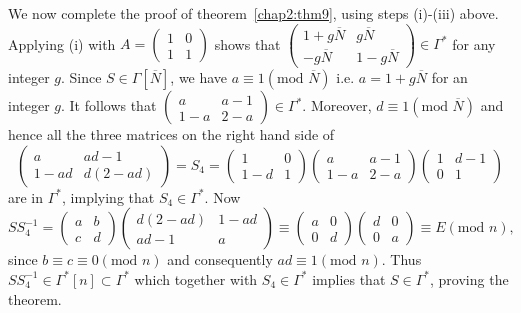 We now \pageoriginale complete the proof of theorem~\ref{chap2:thm9}, using steps
(i)-(iii) above. Applying (i) with $A =
\left(\begin{smallmatrix} 1&0\\1&1 \end{smallmatrix}\right)$ shows
that $\left(\begin{smallmatrix} 1+g\overline{N} &
  g\overline{N}\\ -g\overline{N} & 1-g\overline{N}
\end{smallmatrix} \right)\in
  \Gamma^{\ast}$ for any integer $g$. Since $S \in
  \Gamma[\overline{N}]$, we have $a\equiv 1(\text{mod } \overline{N})$
  i.e. $a=1+g\overline{N}$ for an integer $g$. It follows that
  $\left(\begin{smallmatrix} a& a-1\\
1-a& 2-a \end{smallmatrix}\right) \in
  \Gamma^{\ast}$. Moreover, $d\equiv 1(\text{mod } \overline{N})$ and hence
  all the three matrices on the right hand side of
$$
\left(\begin{smallmatrix} a & ad-1\\
1-ad & d (2-ad)\end{smallmatrix}\right) = S_4 =
\left(\begin{smallmatrix} 1 & 0\\1-d & 1 \end{smallmatrix}\right)
\left(\begin{smallmatrix} a&a-1\\1-a& 2-a \end{smallmatrix}\right)    
\left(\begin{smallmatrix} 1 & d-1\\ 0&1 \end{smallmatrix}\right)
$$
are in $\Gamma^{\ast}$, implying that $S_4 \in
\Gamma^{\ast}$. Now
$$
SS^{-1}_4 = \left(\begin{smallmatrix}
  a&b\\c&d \end{smallmatrix}\right) 
\left(\begin{smallmatrix} d(2-ad) & 1-ad\\
ad-1 & a \end{smallmatrix}\right)\equiv
\left(\begin{smallmatrix} a&0\\0&d \end{smallmatrix}\right)
\left(\begin{smallmatrix}d&0\\0&a \end{smallmatrix}\right)\equiv E
(\text{mod } n),
$$
since $b\equiv c \equiv 0(\text{mod } n)$ and consequently $ad\equiv 1(\text{mod }
n)$. Thus $SS^{-1}_4 \in \Gamma^{\ast}[n] \subset
\Gamma^{\ast}$ which together with $S_4 \in \Gamma^{\ast}$
implies that $S \in \Gamma^{\ast}$, proving the theorem.

